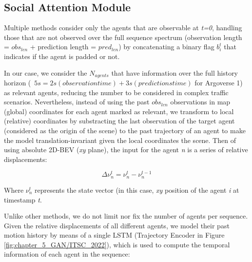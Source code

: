 \subsection{Social Attention Module}
\label{subsec:5_attention_module}

Multiple methods \cite{liang2020learning, schmidt2022crat} consider only the agents that are observable at \textit{t=0}, handling those that are not observed over the full sequence spectrum (observation length = \textit{$obs_{len}$} + prediction length = \textit{$pred_{len}$}) by concatenating a binary flag $b_i^t$ that indicates if the agent is padded or not. 

In our case, we consider the $N_{agents}$ that have information over the full history horizon (\eg \ $5s = 2s (observation time) + 3s (predictions time)$ for Argoverse 1) as relevant agents, reducing the number to be considered in complex traffic scenarios. Nevertheless, instead of using the past $obs_{len}$ observations in map (global) coordinates for each agent marked as relevant, we transform to local (relative) coordinates by substracting the last observation of the target agent (considered as the origin of the scene) to the past trajectory of an agent to make the model translation-invariant given the local coordinates the scene. Then of using absolute 2D-\ac{BEV} (\textit{xy} plane), the input for the agent \textit{n} is a series of relative displacements:

\begin{equation}
	\Delta \nu^{t}_n = \nu^{t}_n - \nu^{t-1}_n
\end{equation}

Where $\nu^{t}_n$ represents the state vector (in this case, \textit{xy} position of the agent \textit{i} at timestamp \textit{t}. %

Unlike other methods, we do not limit nor fix the number of agents per sequence. Given the relative displacements of all different agents, we model their past motion history by means of a single \ac{LSTM} (Trajectory Encoder in Figure \ref{fig:chapter_5_GAN/ITSC_2022}), which is used to compute the temporal information of each agent in the sequence:

